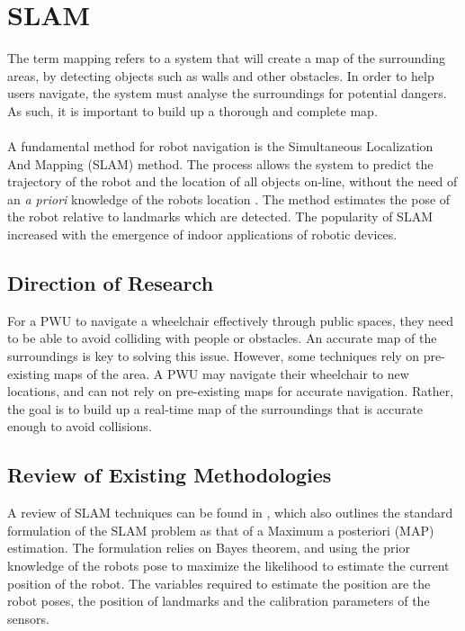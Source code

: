\section{SLAM}
The term mapping refers to a system that will create a map of the surrounding areas, by detecting objects such as walls and other obstacles. In order to help users navigate, the system must analyse the surroundings for potential dangers. As such, it is important to build up a thorough and complete map.

\paragraph{}A fundamental method for robot navigation is the Simultaneous Localization And Mapping (SLAM) method. The process allows the system to predict the trajectory of the robot and the location of all objects on-line, without the need of an \textit{a priori} knowledge of the robots location \citep{Bailey2006a}. The method estimates the pose of the robot relative to landmarks which are detected. The popularity of SLAM increased with the emergence of indoor applications of robotic devices.

\subsection{Direction of Research}
For a PWU to navigate a wheelchair effectively through public spaces, they need to be able to avoid colliding with people or obstacles. An accurate map of the surroundings is key to solving this issue. However, some techniques rely on pre-existing maps of the area. A PWU may navigate their wheelchair to new locations, and can not rely on pre-existing maps for accurate navigation. Rather, the goal is to build up a real-time map of the surroundings that is accurate enough to avoid collisions.

\subsection{Review of Existing Methodologies}
A review of SLAM techniques can be found in \cite{Cadena2016}, which also outlines the standard formulation of the SLAM problem as that of a Maximum a posteriori (MAP) estimation. The formulation relies on Bayes theorem, and using the prior knowledge of the robots pose to maximize the likelihood to estimate the current position of the robot. The variables required to estimate the position are the robot poses, the position of landmarks and the calibration parameters of the sensors.


